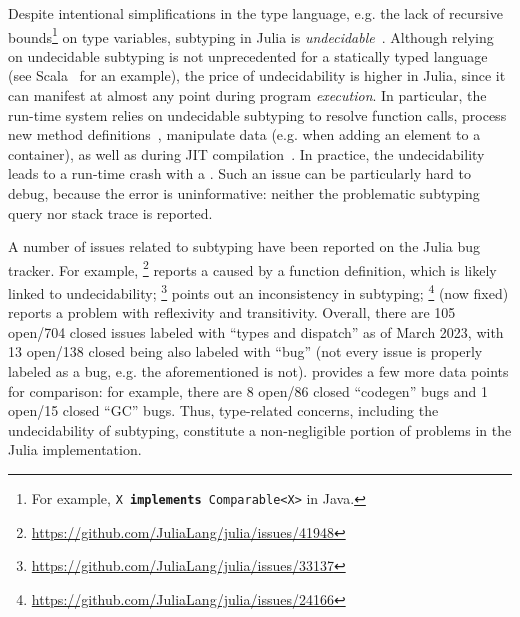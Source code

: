 Despite intentional simplifications in the type language,
e.g. the lack of recursive bounds\footnote{
  For example, \texttt{X \textbf{implements} Comparable<X>} in Java. 
} on type variables,
subtyping in Julia is
\emph{undecidable}~\cite{bib:chung:type-julia-thesis:2023}.
Although relying on undecidable subtyping is not unprecedented
for a statically typed language (see Scala~\cite{bib:hu:dot-undec:2020}
for an example),
the price of undecidability
is higher in Julia, since it
can manifest at almost any point during program \emph{execution}.
In particular, the run-time system relies on undecidable subtyping
to resolve function calls,
process new method definitions~\cite{bib:belyakova:world-age:oopsla:2020},
manipulate data (e.g. when adding an element to a container),
as well as during JIT compilation~\cite{bib:pelenitsyn:type-stability:oopsla:2021}.
In practice, the undecidability
leads to a run-time crash with a .
Such an issue can be particularly hard to debug,
because the error is uninformative: neither the problematic subtyping query
nor stack trace is reported.

A number of issues related to subtyping have been reported
on the Julia bug tracker. For example,
\href{https://github.com/JuliaLang/julia/issues/41948}{}\footnote{
    \url{https://github.com/JuliaLang/julia/issues/41948}
} reports a  caused by a function definition,
which is likely linked to undecidability;
\href{https://github.com/JuliaLang/julia/issues/33137}{}\footnote{
    \url{https://github.com/JuliaLang/julia/issues/33137}
} points out an inconsistency in subtyping; %
\href{https://github.com/JuliaLang/julia/issues/24166}{}\footnote{
    \url{https://github.com/JuliaLang/julia/issues/24166} 
} (now fixed) reports a problem with reflexivity and transitivity.
Overall, there are 105 open/704 closed issues labeled with ``types and
dispatch'' as of March 2023,
with 13 open/138 closed being also labeled with ``bug''
(not every issue is properly labeled as a bug,
e.g. the aforementioned
\href{https://github.com/JuliaLang/julia/issues/24166}{} is not).
 provides a few more data points for comparison:
for example, there are 8 open/86 closed ``codegen'' bugs
and 1 open/15 closed ``GC'' bugs.
Thus, type-related concerns, including the undecidability of subtyping,
constitute a non-negligible portion of problems in the Julia implementation.

